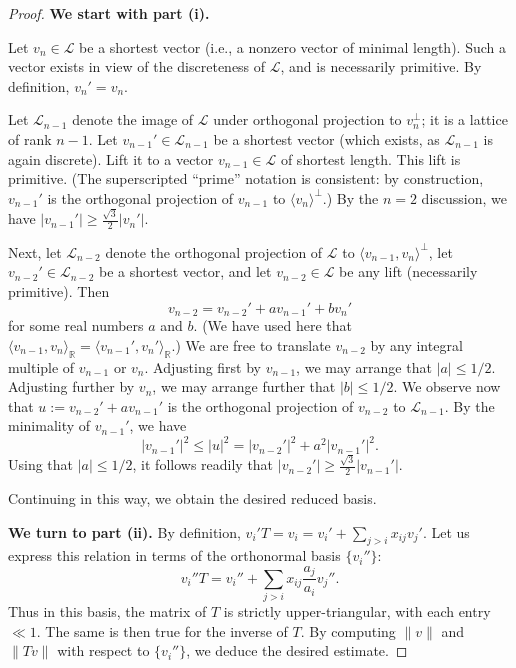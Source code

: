 \documentclass[reqno]{amsart} 
\begin{document}
\begin{proof} {\bf We start with part (i).}
  
  Let $v_n \in \mathcal{L}$ be a shortest vector (i.e., a nonzero vector of minimal length).  Such a vector exists in view of the discreteness of $\mathcal{L}$, and is necessarily primitive.  By definition, $v_n' = v_n$.
  

  Let $\mathcal{L}_{n-1}$ denote the image of $\mathcal{L}$ under orthogonal projection to $v_n^\perp$; it is a lattice of rank $n-1$.  Let $v_{n-1}' \in \mathcal{L}_{n-1}$ be a shortest vector (which exists, as $\mathcal{L}_{n-1}$ is again discrete).  Lift it to a vector $v_{n-1} \in \mathcal{L}$ of shortest length. This lift is primitive.  (The superscripted ``prime'' notation is consistent: by construction, $v_{n-1}'$ is the orthogonal projection of $v_{n-1}$ to $\langle v_n \rangle^\perp$.)  By the $n=2$ discussion, we have $|v_{n-1}'| \geq \frac{\sqrt{3}}{2} |v_n'|$.

  Next, let $\mathcal{L}_{n-2}$ denote the orthogonal projection of $\mathcal{L}$ to $\langle v_{n-1}, v_n \rangle^\perp$, let $v_{n-2}' \in \mathcal{L}_{n-2}$ be a shortest vector, and let $v_{n-2} \in \mathcal{L}$ be any lift (necessarily primitive).  Then
  \begin{equation*}
    v_{n-2} = v_{n-2}' + a v_{n-1}' + b v_n'
  \end{equation*}
  for some real numbers $a$ and $b$.  (We have used here that $\langle v_{n-1}, v_n \rangle_{\mathbb{R}} = \langle v_{n-1}', v_n' \rangle_{\mathbb{R}}$.)  We are free to translate $v_{n-2}$ by any integral multiple of $v_{n-1}$ or $v_n$.  Adjusting first by $v_{n-1}$, we may arrange that $|a| \leq 1/2$.  Adjusting further by $v_n$, we may arrange further that $|b| \leq 1/2$.  We observe now that $u := v_{n-2}' + a v_{n-1}'$ is the orthogonal projection of $v_{n-2}$ to $\mathcal{L}_{n-1}$.  By the minimality of $v_{n-1}'$, we have
  \begin{equation*}
    |v_{n-1}'|^2 \leq |u|^2 = |v_{n-2}'|^2 + a^2 | v_{n-1}'|^2.
  \end{equation*}
  Using that $|a| \leq 1/2$, it follows readily that $|v_{n-2}'| \geq \frac{\sqrt{3}}{2} | v_{n-1}'|$.

  Continuing in this way, we obtain the desired reduced basis.

  {\bf We turn to part (ii).}  By definition, $v_i ' T = v_i = v_i' + \sum_{j > i} x_{i j} v_j'$.  Let us express this relation in terms of the orthonormal basis $\{v_i''\}$:
  \begin{equation*}
    v_i'' T = v_i'' + \sum _{j > i } x_{i j} \frac{a_j}{a_i} v_j''.
  \end{equation*}
  Thus in this basis, the matrix of $T$ is strictly upper-triangular, with each entry $\ll 1$.  The same is then true for the inverse of $T$.  By computing $\|v\|$ and $\|T v\|$ with respect to $\{v_i''\}$, we deduce the desired estimate.


\end{proof}
\end{document}
